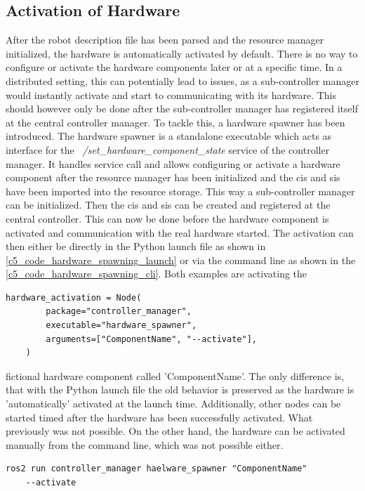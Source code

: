 \subsection{Activation of Hardware}
After the robot description file has been parsed and the resource manager initialized, the hardware is automatically activated by default. There is no way to configure or activate the hardware components later or  at a specific time. In a distributed setting, this can potentially lead to issues, as a sub-controller manager would instantly activate and start to communicating with its hardware. This should however only be done after the sub-controller manager has registered itself at the central controller manager.\newline
To tackle this, a hardware spawner has been introduced. The hardware spawner is a standalone executable which acts as interface for the \textit{~/set\_hardware\_component\_state} service of the controller manager. It handles service call and allows configuring or activate a hardware component after the resource manager has been initialized and the \glspl{ci} and \glspl{si} have been imported into the resource storage. This way a sub-controller manager can be initialized. Then the \glspl{ci} and \glspl{si} can be created and registered at the central controller. This can now be done before the hardware component is activated and communication with the real hardware started.\newline
The activation can then either be directly in the Python launch file as shown in \autoref{c5_code_hardware_spawning_launch} or via the command line as shown in the \autoref{c5_code_hardware_spawning_cli}. Both examples are activating the
\lstset{language=Python,basicstyle=\scriptsize}
\begin{lstlisting}[caption=Example of using the hardware spawner in a python launch file.,label=c5_code_hardware_spawning_launch]
    hardware_activation = Node(
        package="controller_manager",
        executable="hardware_spawner",
        arguments=["ComponentName", "--activate"],
    )
\end{lstlisting}
fictional hardware component called 'ComponentName'. The only difference is, that with the Python launch file the old behavior is preserved as the hardware is 'automatically' activated at the launch time. Additionally, other nodes can be started timed after the hardware has been successfully activated. What previously was not possible. On the other hand, the hardware can be activated manually from the command line, which was not possible either.
\begin{lstlisting}[caption=Example of using the hardware spawner from command line., label=c5_code_hardware_spawning_cli]
ros2 run controller_manager haelware_spawner "ComponentName" 
    --activate
\end{lstlisting}
